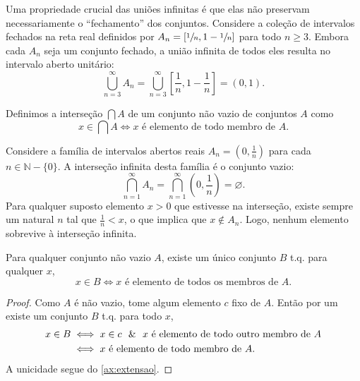 \begin{exemplo}
    Uma propriedade crucial das uniões infinitas é que elas não preservam necessariamente o ``fechamento''  dos conjuntos. Considere a coleção de intervalos fechados na reta real definidos por \(A_n = [\sfrac{1}{n}, 1 - \sfrac{1}{n}]\) para todo \(n \geq 3\). Embora cada \(A_n\) seja um conjunto fechado, a união infinita de todos eles resulta no intervalo aberto unitário:
    \[
        \bigcup_{n=3}^{\infty} A_n = \bigcup_{n=3}^{\infty} \left[\frac{1}{n}, 1 - \frac{1}{n}\right] = (0, 1).
    \]
\end{exemplo}

\begin{definicao}
    \label{def:intersecao_arbitraria}
    Definimos a interseção \(\bigcap A\) de um conjunto não vazio de conjuntos \(A\) como
    \[
        x \in \bigcap A \iff x \text{ é elemento de todo membro de } A.
    \]
\end{definicao}



\begin{exemplo}
    Considere a família de intervalos abertos reais \(A_n = (0, \frac{1}{n})\) para cada \(n \in \mathbb{N} - \{0\}\). A interseção infinita desta família é o conjunto vazio:
    \[
        \bigcap_{n=1}^{\infty} A_n = \bigcap_{n=1}^{\infty} \left(0, \frac{1}{n}\right) = \varnothing.
    \]
    Para qualquer suposto elemento \(x > 0\) que estivesse na interseção, existe sempre um natural \(n\) tal que \(\frac{1}{n} < x\), o que implica que \(x \notin A_n\). Logo, nenhum elemento sobrevive à interseção infinita.
\end{exemplo}

\begin{teorema}
    \label{teo:intersecao_unica}
    Para qualquer conjunto não vazio \(A\), existe um único conjunto \(B\) t.q. para qualquer \(x\),
    \[
        x \in B \iff x \text{ é elemento de todos os membros de } A.
    \]
\end{teorema}

\begin{proof}
    Como \(A\) é não vazio, tome algum elemento \(c\) fixo de \(A\). Então por um  existe um conjunto \(B\) t.q. para todo \(x\),
    \begin{align*}
        x \in B & \iff x \in c \ \ \& \ \  x \text{ é elemento de todo outro membro de } A \\
                & \iff x \text{ é elemento de todo membro de } A.
    \end{align*}
    A unicidade segue do \autoref{ax:extensao}.
\end{proof}

